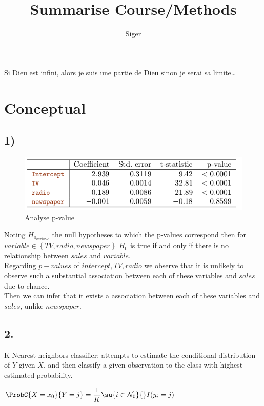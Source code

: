 \documentclass[a4paper, 10pt]{scrartcl}  %
\title{Summarise Course/Methods}
\author{Siger}
\begin{document}
\maketitle

Si Dieu est infini, alors je suis une partie de Dieu sinon je serai sa limite\ldots

\tableofcontents

\section{Conceptual}
\subsection{1)}
\begin{figure}[H]
	\begin{center}
		\includegraphics[width=\textwidth]{./images/table3_4.png}
	\end{center}
	\caption{Analyse p-value}
	\label{fig:1}
\end{figure}
Noting $H_{0_{variable}}$ the null hypotheses to which the p-values 
correspond then for $variable\in\left\{ TV,radio,newspaper \right\}$
$H_{0}$ is true if and only if there is no relationship between $sales\text{ and }variable$.\\
Regarding $p-values$ of $intercept, TV, radio$ we observe that it is
unlikely to observe such a 
substantial association between each of these variables and $sales$ due to chance.\\
Then we can infer that it exists a association between each of these 
variables and $sales$, unlike $newspaper$.
\subsection{2.}
K-Nearest neighbors classifier: attempts to estimate the conditional
distribution of $Y$ given $X$, and then classify a
given observation to the class with highest estimated probability.
\begin{center}
	$\ProbC{X=x_{0}}{Y=j}=\dfrac{1}{K}\su{ {i\in\mathcal{N}_{0}}}{}I(y_{i}=j)$
\end{center}
\end{document}
